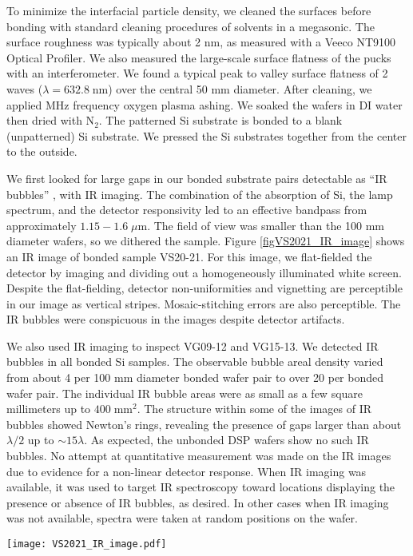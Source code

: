 \documentclass[osajnl,twocolumn,showpacs,superscriptaddress,11pt]{revtex4-1} %
\begin{document}
To minimize the interfacial particle density, we cleaned the surfaces before bonding with standard cleaning procedures of solvents in a megasonic.  The surface roughness was typically about 2 nm, as measured with a Veeco NT9100 Optical Profiler.  We also measured the large-scale surface flatness of the pucks with an interferometer.  We found a typical peak to valley surface flatness of 2 waves ($\lambda=632.8\;$nm) over the central 50 mm diameter.  After cleaning, we applied MHz frequency oxygen plasma ashing.  We soaked the wafers in DI water then dried with N$_2$.  The patterned Si substrate is bonded to a blank (unpatterned) Si substrate.  We pressed the Si substrates together from the center to the outside.

We first looked for large gaps in our bonded substrate pairs detectable as ``IR bubbles'' \cite{1992JEMat..21..669M}, with IR imaging.  The combination of the absorption of Si, the lamp spectrum, and the detector responsivity led to an effective bandpass from approximately $1.15-1.6\;\mu$m.  The field of view was smaller than the 100 mm diameter wafers, so we dithered the sample.  Figure \ref{figVS2021_IR_image} shows an IR image of bonded sample VS20-21.  For this image, we flat-fielded the detector by imaging and dividing out a homogeneously illuminated white screen. Despite the flat-fielding, detector non-uniformities and vignetting are perceptible in our image as vertical stripes.  Mosaic-stitching errors are also perceptible.  The IR bubbles were conspicuous in the images despite detector artifacts.

We also used IR imaging to inspect VG09-12 and VG15-13.  We detected IR bubbles in all bonded Si samples.  The observable bubble areal density varied from about 4 per 100 mm diameter bonded wafer pair to over 20 per bonded wafer pair.  The individual IR bubble areas were as small as a few square millimeters up to $400\;\mathrm{mm}^2$.  The structure within some of the images of IR bubbles showed Newton's rings, revealing the presence of gaps larger than about $\lambda/2$ up to $\sim 15 \lambda$.  As expected, the unbonded DSP wafers show no such IR bubbles.  No attempt at quantitative measurement was made on the IR images due to evidence for a non-linear detector response.  When IR imaging was available, it was used to target IR spectroscopy toward locations displaying the presence or absence of IR bubbles, as desired.  In other cases when IR imaging was not available, spectra were taken at random positions on the wafer.

\begin{figure*}[!htbp]
\texttt{[image: VS2021\_IR\_image.pdf]}
\caption{
\label{figVS2021_IR_image}
IR image of part VS20-21. Three rectangular mesh areas are apparent (Table \ref{tbl_meshPatterns}).  The coarsest mesh, C, shows substructure, while the medium and fine meshes are indistinguishable at the low resolution of the image.  The three dark spots are bubbles at the interface of the direct bonded Si samples.}
\end{figure*}
\end{document}
